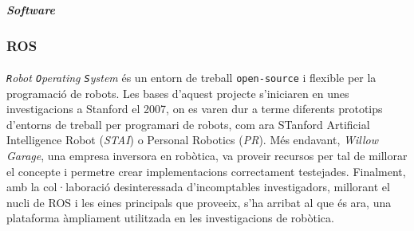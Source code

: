 \documentclass[12pt,a4paper,final,twoside]{article}
\begin{document}


\label{Software}
\vspace{20pt}
\textbf{\textit{Software}}


  


\subsubsection{ROS}
\label{ROS}

\paragraph{}\textit{\texttt{R}obot \texttt{O}perating \texttt{S}ystem} \cite{ROS} és un entorn de treball \texttt{open-source} i flexible per la programació de robots. Les bases d'aquest projecte s'iniciaren en unes investigacions a Stanford el 2007, on es varen dur a terme diferents prototips d'entorns de treball per programari de robots, com ara STanford Artificial Intelligence Robot (\textit{STAI}) o Personal Robotics (\textit{PR}). Més endavant, \textit{Willow Garage}, una empresa inversora en robòtica, va proveir recursos per tal de millorar el concepte i permetre crear implementacions correctament testejades. Finalment, amb la col·laboració desinteressada d'incomptables investigadors, millorant el nucli de ROS i les eines principals que proveeix, s'ha arribat al que és ara, una plataforma àmpliament utilitzada en les investigacions de robòtica.
\end{document}
